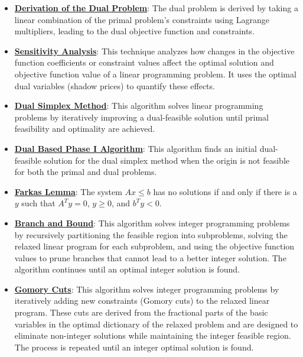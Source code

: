 \documentclass{article}%
\begin{document}
\begin{itemize}[leftmargin=*]%
\item \href{https://www.math.purdue.edu/~yipn/421/2024-10-01-DualGeneralLP.pdf#page=1}{\textbf{Derivation of the Dual Problem}}: The dual problem is derived by taking a linear combination of the primal problem's constraints using Lagrange multipliers, leading to the dual objective function and constraints.%
\end{itemize}%
\begin{itemize}[leftmargin=*]%
\item \href{https://www.math.purdue.edu/~yipn/421/2024-10-01-SensitivityDuality.pdf#page=7}{\textbf{Sensitivity Analysis}}: This technique analyzes how changes in the objective function coefficients or constraint values affect the optimal solution and objective function value of a linear programming problem. It uses the optimal dual variables (shadow prices) to quantify these effects.%
\end{itemize}%
\begin{itemize}[leftmargin=*]%
\item \href{https://www.math.purdue.edu/~yipn/421/2024-10-03-DualSimplexMatrix.pdf#page=2}{\textbf{Dual Simplex Method}}: This algorithm solves linear programming problems by iteratively improving a dual-feasible solution until primal feasibility and optimality are achieved.%
\item \href{https://www.math.purdue.edu/~yipn/421/2024-10-03-DualSimplexMatrix.pdf#page=5}{\textbf{Dual Based Phase I Algorithm}}: This algorithm finds an initial dual-feasible solution for the dual simplex method when the origin is not feasible for both the primal and dual problems.%
\end{itemize}%
\begin{itemize}[leftmargin=*]%
\item \href{https://www.math.purdue.edu/~yipn/421/2024-10-28-Farkas.pdf#page=1}{\textbf{Farkas Lemma}}: The system $Ax \le b$ has no solutions if and only if there is a $y$ such that $A^T y = 0$, $y \ge 0$, and $b^T y < 0$.%
\end{itemize}%
\begin{itemize}[leftmargin=*]%
\item \href{https://www.math.purdue.edu/~yipn/421/2024-10-31-IntLinProg.pdf#page=5}{\textbf{Branch and Bound}}: This algorithm solves integer programming problems by recursively partitioning the feasible region into subproblems, solving the relaxed linear program for each subproblem, and using the objective function values to prune branches that cannot lead to a better integer solution. The algorithm continues until an optimal integer solution is found.%
\item \href{https://www.math.purdue.edu/~yipn/421/2024-10-31-IntLinProg.pdf#page=15}{\textbf{Gomory Cuts}}: This algorithm solves integer programming problems by iteratively adding new constraints (Gomory cuts) to the relaxed linear program. These cuts are derived from the fractional parts of the basic variables in the optimal dictionary of the relaxed problem and are designed to eliminate non-integer solutions while maintaining the integer feasible region. The process is repeated until an integer optimal solution is found.%
\end{itemize}%
\end{document}
